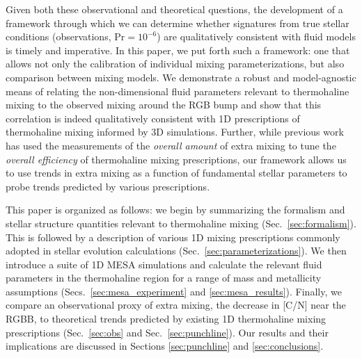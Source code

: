 Given both these observational and theoretical questions, the development of a framework through which we can determine whether signatures from true stellar conditions (observations, $\mathrm{Pr} = 10^{-6}$) are qualitatively consistent with fluid models is timely and imperative. 
In this paper, we put forth such a framework: one that allows not only the calibration of individual mixing parameterizations, but also comparison between mixing models. We demonstrate a robust and model-agnostic means of relating the non-dimensional fluid parameters relevant to thermohaline mixing to the observed mixing around the RGB bump and show that this correlation is indeed qualitatively consistent with 1D prescriptions of thermohaline mixing informed by 3D simulations. Further, while previous work \citep[e.g.][]{charbonnel_thermohaline_2007} has used the measurements of the \textit{overall amount} of extra mixing to tune the \textit{overall efficiency} of thermohaline mixing prescriptions, our framework allows us to use trends in extra mixing as a function of fundamental stellar parameters to probe trends predicted by various prescriptions.

This paper is organized as follows: we begin by summarizing the formalism and stellar structure quantities relevant to thermohaline mixing (Sec.~\ref{sec:formalism}). This is followed by a description of various 1D mixing prescriptions commonly adopted in stellar evolution calculations (Sec.~\ref{sec:parameterizations}). We then introduce a suite of 1D MESA simulations and calculate the relevant fluid parameters in the thermohaline region for a range of mass and metallicity assumptions (Secs.~\ref{sec:mesa_experiment} and \ref{sec:mesa_results}). Finally, we compare an observational proxy of extra mixing, the decrease in [C/N] near the RGBB, to theoretical trends predicted by existing 1D thermohaline mixing prescriptions (Sec.~\ref{sec:obs} and Sec.~\ref{sec:punchline}). Our results and their implications are discussed in Sections \ref{sec:punchline} and \ref{sec:conclusions}. 